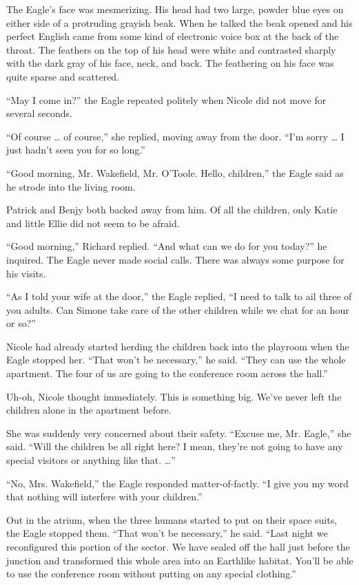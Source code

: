 \documentclass[]{article}
\begin{document}
{The Eagle’s face was mesmerizing.  His head had two large, powder blue eyes on either side of a protruding grayish beak.  When he talked the beak opened and his perfect English came from some kind of electronic voice box at the back of the throat.  The feathers on the top of his head were white and contrasted sharply with the dark gray of his face, neck, and back.  The feathering on his face was quite sparse and scattered.

“May I come in?” the Eagle repeated politely when Nicole did not move for several seconds.

“Of course … of course,” she replied, moving away from the door.  “I’m sorry … I just hadn’t seen you for so long.”

“Good morning, Mr.  Wakefield, Mr.  O’Toole.  Hello, children,” the Eagle said as he strode into the living room.

Patrick and Benjy both backed away from him.  Of all the children, only Katie and little Ellie did not seem to be afraid.

“Good morning,” Richard replied.  “And what can we do for you today?” he inquired.  The Eagle never made social calls.  There was always some purpose for his visits.

“As I told your wife at the door,” the Eagle replied, “I need to talk to ail three of you adults.  Can Simone take care of the other children while we chat for an hour or so?”

Nicole had already started herding the children back into the playroom when the Eagle stopped her.  “That won’t be necessary,” he said.  “They can use the whole apartment.  The four of us are going to the conference room across the hall.”

Uh-oh, Nicole thought immediately.  This is something big.  We’ve never left the children alone in the apartment before.

She was suddenly very concerned about their safety.  “Excuse me, Mr.  Eagle,” she said.  “Will the children be all right here? I mean, they’re not going to have any special visitors or anything like that.  …”

“No, Mrs.  Wakefield,” the Eagle responded matter-of-factly.  “I give you my word that nothing will interfere with your children.”

Out in the atrium, when the three humans started to put on their space suits, the Eagle stopped them.  “That won’t be necessary,” he said.  “Last night we reconfigured this portion of the sector.  We have sealed off the hall just before the junction and transformed this whole area into an Earthlike habitat.  You’ll be able to use the conference room without putting on any special clothing.”

}
\end{document}
